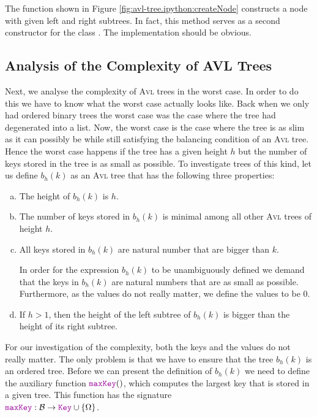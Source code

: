 The function  shown in Figure \ref{fig:avl-tree.ipython:createNode}
constructs a node with given left and right subtrees.  In fact, this method serves as a second
constructor for the class .  The implementation should be obvious.


\subsection{Analysis of the Complexity of AVL Trees}
Next, we analyse the complexity of \textsc{Avl} trees in the worst case.  In order to do this we have to know
what the worst case actually looks like.  Back when we only had ordered binary trees the worst case was the case where
the tree had degenerated into a list.  Now, the worst case is the case where the tree is as slim as
it can possibly be while still satisfying the balancing condition of an \textsc{Avl} tree.  Hence the worst case
happens if the tree has a given height $h$ but the number of keys stored in the tree is as small as
possible.  To investigate trees of this kind, let us define  $b_h(k)$ as an \textsc{Avl} tree that has the following three
properties:
\begin{enumerate}[(a)]
\item The height of $b_h(k)$ is $h$.
\item The number of keys stored in $b_h(k)$ is minimal among all other \textsc{Avl} trees of height $h$.  
\item All keys stored in  $b_h(k)$ are natural number that are bigger than  $k$.

      In order for the expression $b_h(k)$ to be unambiguously defined we demand that the keys
      in $b_h(k)$ are natural numbers that are as small as possible.  Furthermore, as the values do
      not really matter, we define the values to be $0$.
\item If $h > 1$, then the height of the left subtree of $b_h(k)$ is bigger than the height of its right subtree.
\end{enumerate}
For our investigation of the complexity, both the keys and the values do not really matter.  The only problem
is that we have to ensure that the tree $b_h(k)$ is an ordered tree.
Before we can present the definition of $b_h(k)$ we need to define the auxiliary function
$\mytt{maxKey}()$, which computes the largest key that is stored in a given tree.  This function has the
 signature  
\\[0.2cm]
\hspace*{1.3cm}
$\mytt{maxKey}:\mathcal{B} \rightarrow \mytt{Key} \cup \{ \Omega \}$.
